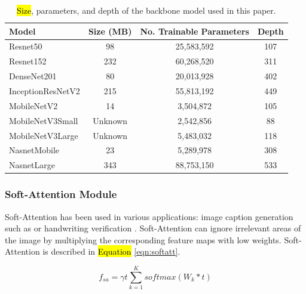 \documentclass[sensors,article,accept,pdftex,moreauthors]{Definitions/mdpi}
\begin{document}
	\begin{table}[H]
		\caption{\hl{Size}, parameters, and depth of the backbone model used in this paper.}%
		\label{table:model-summary}
		\setlength{\tabcolsep}{5.2mm}\begin{tabular}{l  c c c} 
\toprule
\textbf{Model} & \textbf{Size (MB)} & \textbf{No. Trainable Parameters} & \textbf{Depth} \\ 
\midrule
Resnet50 & 98 & 25,583,592 & 107 \\ 
\midrule
Resnet152 & 232 & 60,268,520 & 311 \\ 
\midrule
DenseNet201 & 80 & 20,013,928 & 402 \\
\midrule
InceptionResNetV2 & 215 & 55,813,192 & 449 \\
\midrule
MobileNetV2 & 14 & 3,504,872 & 105 \\ 
\midrule
MobileNetV3Small & Unknown & 2,542,856 & 88 \\ 
\midrule
MobileNetV3Large & Unknown & 5,483,032 & 118 \\
\midrule
NasnetMobile & 23 & 5,289,978 & 308 \\
\midrule
NasnetLarge & 343 & 88,753,150 & 533 \\ 
\bottomrule
		\end{tabular}
	\end{table}
	
	\subsubsection{Soft-Attention Module}
	Soft-Attention has been used in various applications: image caption generation such as \cite{03044} or handwriting verification \cite{202017}. Soft-Attention can ignore irrelevant areas of the image by multiplying the corresponding feature maps with low weights. Soft-Attention is described in \hl{Equation}
	\eqref{eqn:softatt}. %
	
	\begin{equation}
		\label{eqn:softatt}
		f_{sa} = \gamma t\sum_{k=1}^{K}softmax(W_k * t)
	\end{equation}
	
\end{document}
